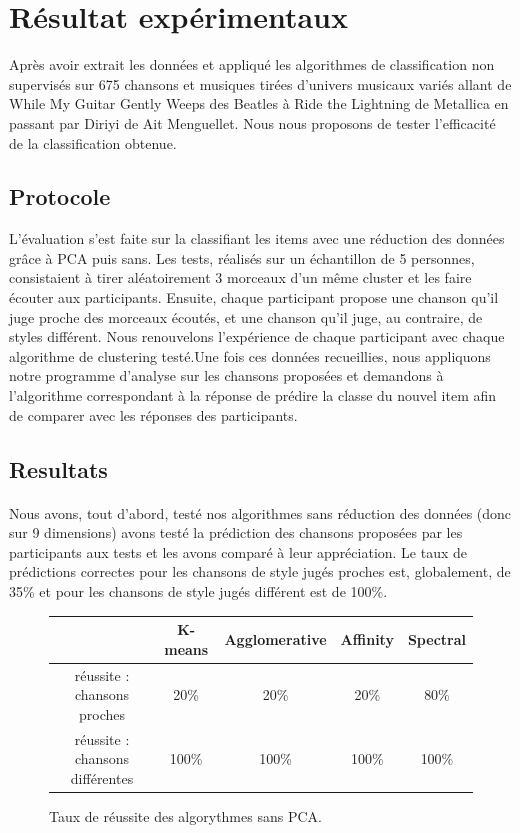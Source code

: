 \documentclass[soumission]{ir}
\begin{document}
\section{Résultat expérimentaux}
Après avoir extrait les données et appliqué les algorithmes de classification non supervisés sur 675 chansons et musiques tirées 
d’univers musicaux variés allant de While My Guitar Gently Weeps des Beatles à Ride the Lightning de Metallica 
en passant par Diriyi de Ait Menguellet. Nous nous proposons de tester l’efficacité de la classification obtenue.

\subsection{Protocole}
L’évaluation s’est faite sur la classifiant les items avec une réduction des données grâce à PCA puis sans. Les 
tests, réalisés sur un échantillon de 5 personnes, consistaient à tirer aléatoirement 3 morceaux d’un même 
cluster et les faire écouter aux participants. Ensuite, chaque participant propose une chanson qu’il juge proche 
des morceaux écoutés, et une chanson qu’il juge, au contraire, de styles différent. Nous renouvelons l’expérience 
de chaque participant avec chaque algorithme de clustering testé.Une fois ces données recueillies, nous 
appliquons notre programme d’analyse sur les chansons proposées et demandons à l’algorithme correspondant à la 
réponse de prédire la classe du nouvel item afin de comparer avec les réponses des participants.

\subsection{Resultats}
\paragraph{}
Nous avons, tout d’abord, testé nos algorithmes sans réduction des données (donc sur 9 dimensions) avons testé 
la prédiction des chansons proposées par les participants aux tests et les avons comparé à leur appréciation. Le 
taux de prédictions correctes pour les chansons de style jugés proches est, globalement, de 35\% et pour les 
chansons de style jugés différent est de 100\%.


\begin{figure}[ht]
    \centering
    \begin{tabular}{ccccc}
        \phantom & K-means & Agglomerative & Affinity & Spectral\\
        \hline
        réussite : chansons proches & 20\%& 20\% & 20\% & 80\%\\
        réussite : chansons différentes & 100\% & 100\% & 100\% & 100\%\\
        \hline
    \end{tabular}
    \caption{Taux de réussite des algorythmes sans PCA.}
    \label{test}
\end{figure}
\end{document}
